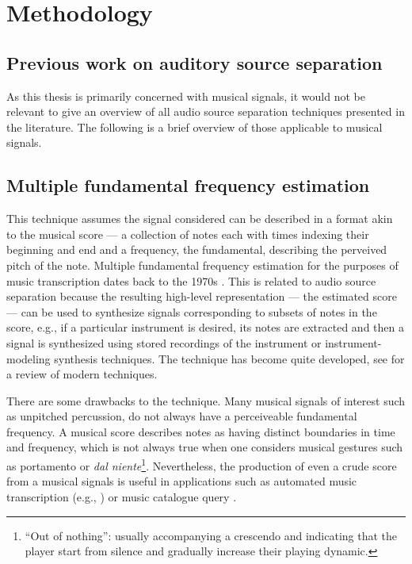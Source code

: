 \chapter{Methodology}

\section{Previous work on auditory source separation}

As this thesis is primarily concerned with musical signals, it would not be
relevant to give an overview of all audio source separation techniques presented
in the literature. The following is a brief overview of those applicable to
musical signals.

\section{Multiple fundamental frequency estimation}

This technique assumes the signal considered can be described in a format akin
to the musical score --- a collection of notes each with times indexing their
beginning and end and a frequency, the fundamental, describing the perveived
pitch of the note. Multiple fundamental frequency estimation for the purposes of music
transcription dates back to the 1970s \cite[ch.~20]{havelock2008handbook}
\cite{moorer1977transcription}. This
is related to audio source separation because the resulting high-level
representation --- the estimated score --- can be used to synthesize signals
corresponding to subsets of
notes in the score, e.g., if a particular instrument is desired, its notes are
extracted and then a signal is synthesized using stored recordings of the
instrument or instrument-modeling synthesis techniques. The technique has become
quite developed, see \cite[ch.~20]{havelock2008handbook} for a review of
modern techniques.

There are some drawbacks to the technique. Many musical signals of interest such
as unpitched percussion, do not always have a perceiveable fundamental
frequency. A musical score describes notes as having distinct boundaries in time
and frequency, which is not always true when one considers
musical gestures such as portamento or \textit{dal niente}\footnote{``Out of
    nothing'': usually accompanying a crescendo and indicating that the player
start from silence and gradually increase their playing dynamic.}. Nevertheless,
the production of even a crude score from a musical signals is useful in
applications such as automated music transcription (e.g.,
\cite{ryynanen2008automatic}) or music catalogue query
\cite{mcnab1996towards}.

